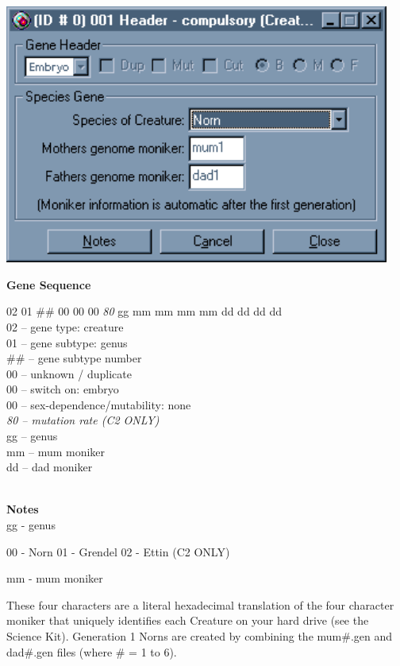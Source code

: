 \documentclass[11pt,twoside,a4paper]{article}
\begin{document}
\begin{minipage}[ht]{0.40\textwidth}
	\includegraphics[width=0.95\textwidth]{img/gen21k.png}
\end{minipage} \hfill \begin{minipage}[ht]{0.575\textwidth}
	\textbf{\large Gene Sequence} %

	02 01 \#\# 00 00 00 \emph{80} gg mm mm mm mm dd dd dd dd ~\\

	02 -- gene type: creature ~\\
	01 -- gene subtype: genus ~\\
	\#\# -- gene subtype number ~\\
	00 -- unknown / duplicate ~\\
	00 -- switch on: embryo ~\\
	00 -- sex-dependence/mutability: none ~\\
	\emph{80 -- mutation rate (C2 ONLY)} ~\\
	gg -- genus ~\\
	mm -- mum moniker ~\\
	dd -- dad moniker ~\\  
\end{minipage} ~\\

\textbf{\large Notes}~\\

gg - genus

    00 - Norn
    01 - Grendel
    02 - Ettin (C2 ONLY) 

mm - mum moniker

These four characters are a literal hexadecimal translation of the four character moniker that uniquely identifies each Creature on your hard drive (see the Science Kit). Generation 1 Norns are created by combining the mum#.gen and dad#.gen files (where # = 1 to 6).
\end{document}
